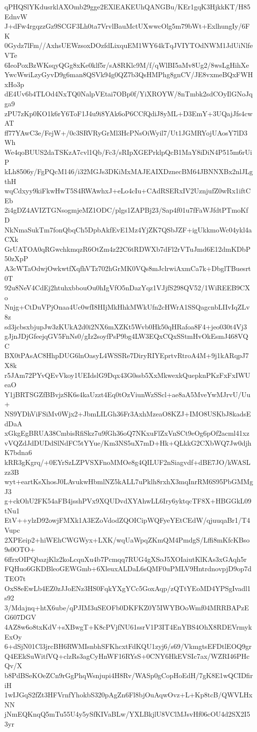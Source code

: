 qPHQSlYKdusrklAXOmb29gge2EXlEAKEUhQANGBu/KEr1gqK3HjkkKT/H85EdnvW
J+dFw4rgqzzGz9SCGF3Lh0ta7VrvlBauMctUXwwcOlg5m79bWt+ExlhungIy/6FK
0Gydz7lFm//AxhsUEWzsoxDOzfdLixquEM1WY64kTqJVIYTOdNWM1JdUiNlfeVTe
6IeoPoxBzWKsqyQGg8xKe0klf5r/sA8RKlc9M/f/qWlBI5aMv8Ug2/8wsLgHihXe
YwcWwiLzyGyvD9g6man8QSVk94g0QZ7b3QsHMPhg8gnCV/JE8vxmeBQxFWHxHo3p
dE4Uv6b4TLOd4NxTQ0NalpVEtai7OBp0f/YiXROYW/8nTmbk2sdCOyIlGNoJqga9
zPU7zKp0KO1k6rY6ToF1J4u9i8YAk6oP6CCfQdiJ8yML+D3EmY+3UQajJfs4cwAT
ff77YAwC3e/FejW+/0c3SRVRyGrMl3HcPNsOiWyil7/Ut1JGMRYojUAosY7lD3Wh
We4qoBUUS2daTSKzA7cvl1Qb/Fc3/sRIpXGEPrklpQcB1MaY8iDiN4P515m6rUiP
kLh8506y/FgPQcM146/i32MGJs3DKiMxMAJEAIXDznecBM64JBNNXBx2nlJLgthH
wqCdxyy9kiFkwHwT5S4RWAwhxJ+eLo4cIu+CAdRSERxIV2UznjufZ0wRx1iftCEb
2i4gDZ4AVIZTGNsogmjeMZ1ODC/plgs1ZAPBj23/Sap4f01u7fFaWJfdtPTmoKfD
NkNmaSukTm7fonQbqCh5DpbAkfEvE1Mz4YjZK7QSbJZF+igUkkmoWc04ykl4aCXk
GrUATOA0qRGwchkmqzR6OtZm4z22C6tRDWXb7dFl2rVTuJmd6E12dmKDbP50zXpP
A3cWTaOdwjOwkwtfXqfhVTz702hGrMK0VQs8mJclrwiAxmCa7k+DbglTBuesrt0T
92u8NeV4CdEj2htuhxbbouOu0hIgVfO5nDazYqz1VJjfS298QV52/1WiREEB9CXo
Nnjg+CtDuVPjOnaa4Uc0wfI8HIjMkHhkMWkUfn2cHWrA1SSQagcnbLIIvIqZLv8z
sd3jcbsxbjupJw3zKUkA2d0i2NX6mXZKt5Wvb0Hk50qHRafoa8F4+jeo030t4Vj3
gJjnJDjGfeejqGV5FnNs0/gIz2soyfPsP9bg4LW3EQxCQxSStmHvOkEsmJ468VQC
BX0tPAsAC8HhpDUG6lnOasyL4WSSRe7DiryRIYEprtvRtroA4M+9j1kARqpJ7X8k
r5JAm72PYvQEvVkoy1UEIdslG9Dqx43G0ssb5XxMkwexkQuepknPKzFxFxIWUeaO
Y1jBRTSGZfBBvjzSK6s4kaUzzt4Eq0tOzViunWzSScl+ae8aA5MveYwMJrvU/Uu+
NS9YDhViFSiMv0Wjx2+JbmLILGh36Fr3AxhMzeaO8KZJ+IMO8USKbJ8kadsEdDaA
xGkgEgBRUA38CmbisRfiSkz7u9fGh36oQ7NKxuFlZxVnSCt9eOg6pOf2acml41xz
vVQZdJdDUDdSlNdFC5tYYue/Km3NS5uX7mD+Hk+QLkkG2CXbWQ7Jw0djhK7bdna6
kRR3gKgrq/+0EYrSzLZPVSXFnoMMOe8g4QILUF2nSiagvdf+dBE7JO/kWASLzz3B
wyt+eartKsXhosJ0LAvukwHbmlNZ5kALL7uPklh8rxhX3mqInrRM6S95PbGMMgJ3
g+ckOhU2FK54aFB4jsshPVx9XQUDvdXYAhwLL6Iry6yktqcTF8X+HBGGkL09tNu1
EtV++ylzD92owjFMXk1A3EZoVdodZQOICipWQFyeYEtCEdW/qjuuqaBr1/T4Vupc
2XPEeip2+hiWEhCWGWyx+LXK/wqUaWpqZKmQM4PmdgS/Lffi8mKfcKBso9s0OTO+
6ffrxOIPQbazjKlz2koLcquXu4b7Pcmqq7RUG4gXSoJ5XOIaiutKlKAs3xGAqh5r
FQHuo6GKDBleoGEWGmb+6XleuxALDaL6sQMF0uPMLV9HntrdnovpjD9op7dTEO7t
OxS8eEwLb4EZ0zJJoENz3HS0FqkYXgYCc5GoxAqp/zQTtYEoMD4YPSgIvadl1s92
3/Mdajnq+htX6ube/qPJIM3uSEOFb0DKFKZ0Y5IWYBOoWmf04MRRBAPzEG607DGV
4AZ8w6o8txKdV+sXBwgT+K8cPVjfNU61ssrV1P3IT4EnYBS4OhX8RDEVrmykExOy
6+dSjN01Cl3jrcBH6RWMIsnbhSFKhcxtFdKQU1zyj6/s69/VkmgtsEFDtlEOQ9gr
Q4EEkSuWitfVQ+clzRs3agCyHnWF16RYsS+0CNY6HkEVSIc7ax/WZRI46PHcQv/X
b8PdBSeKOeZCn9rGgPhqWsnjupi4H8Rv/WASp0gCopHoEdH/7gK8E1wQCIDfiriH
1wIJGqS2fZt3HFVrnfYhokbS320pAgZn6Fl8bjOuAqwOvz+L+Kp8tcB/QWVLHxNN
jNmEQKnqQ5mTu55U4y5ySfKIVaBLw/YXLBkjlU8VClMJsvHf06cOU4d2SX2I53yr
